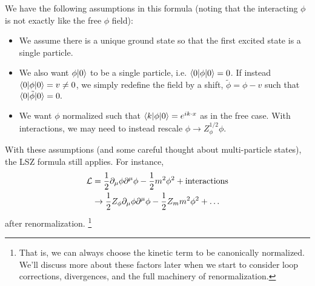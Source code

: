 We have the following assumptions in this formula (noting that the interacting $\phi$ is not exactly like the free $\phi$ field):
\begin{itemize}
    \item We assume there is a unique ground state so that the first excited state is a single particle.
    \item We also want $\phi\lvert0\rangle$ to be a single particle, i.e.
    $\langle0\rvert\phi \lvert0\rangle=0$. If instead $\langle0\rvert\phi\lvert0\rangle= v \neq 0$, we simply redefine the field by a shift, $\tilde \phi = \phi-v$ such that $\langle0\rvert\tilde \phi\lvert0\rangle=0.$
    \item We want $\phi$ normalized such that $\langle k\rvert\phi\lvert0\rangle=e^{ik\cdot x}$ as in the free case. With interactions, we may need to instead rescale $\phi \to Z_\phi^{1/2} \phi$. 
\end{itemize}
With these assumptions (and some careful thought about multi-particle states), the LSZ formula still applies. For instance,
\begin{align*}
    \mathcal L &= \frac{1}{2} \partial_\mu \phi \partial^\mu \phi -\frac{1}{2} m^2 \phi^2 +\text{interactions}\\
    &\to \frac{1}{2} Z_\phi \partial_\mu \phi \partial^\mu \phi-\frac{1}{2} Z_m m^2 \phi^2 +\ldots
\end{align*}
after renormalization.%
    \footnote{That is, we can always choose the kinetic term to be canonically normalized. We'll discuss more about these factors later when we start to consider loop corrections, divergences, and the full machinery of renormalization.}